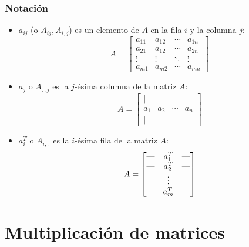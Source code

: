\documentclass[10pt]{beamer}
\begin{document}
\begin{frame}
    \frametitle{Notación}
    \begin{itemize}
        \item $a_{ij}$ (o $A_{ij}, A_{i,j}$) es un elemento de $A$ en la fila $i$ y la columna $j$:
            \begin{equation}
                A = \begin{bmatrix}
                    a_{11} & a_{12} & \cdots & a_{1n} \\
                    a_{21} & a_{12} & \cdots & a_{2n} \\
                    \vdots & \vdots & \ddots & \vdots \\
                    a_{m1} & a_{m2} & \cdots & a_{mn} 
                \end{bmatrix}
            \end{equation}
        \item $a_{j}$ o $A_{:,j}$ es la $j$-ésima columna de la matriz $A$:
            \begin{equation}
                A = \begin{bmatrix}
                    | & | &   & | \\
                    a_1 & a_2 & \cdots & a_n \\
                    | & | &   & | 
                \end{bmatrix}
            \end{equation}
        \item $a_{i}^T$ o $A_{i,:}$ es la $i$-ésima fila de la matriz $A$:
            \begin{equation}
                A = \begin{bmatrix}
                    \text{\textemdash} & a_1^T & \text{\textemdash} \\
                    \text{\textemdash} & a_2^T & \text{\textemdash} \\
                          & \vdots &  \\
                    \text{\textemdash} & a_m^T & \text{\textemdash} \\
                \end{bmatrix}
            \end{equation}
    \end{itemize}
\end{frame}


\section{Multiplicación de matrices}
\end{document}
